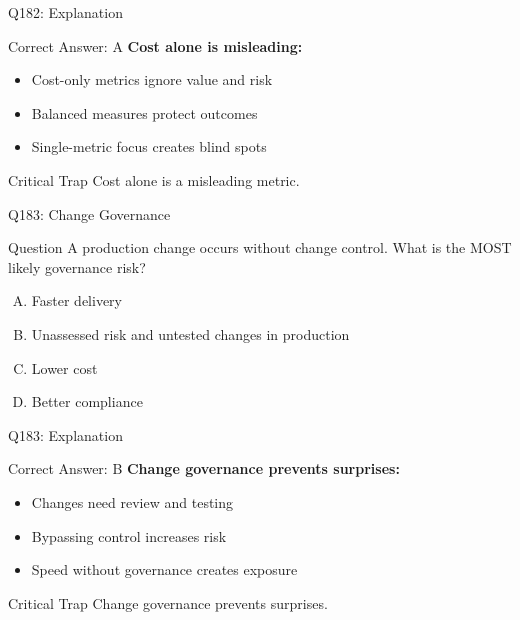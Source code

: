 \documentclass{beamer}
\begin{document}
	\begin{frame}{Q182: Explanation}
		\begin{block}{Correct Answer: A}
			\textbf{Cost alone is misleading:}
			\begin{itemize}
				\item Cost-only metrics ignore value and risk
				\item Balanced measures protect outcomes
				\item Single-metric focus creates blind spots
			\end{itemize}
		\end{block}
		\begin{alertblock}{Critical Trap}
			Cost alone is a misleading metric.
		\end{alertblock}
	\end{frame}
	
	\begin{frame}{Q183: Change Governance}
		\begin{block}{Question}
			A production change occurs without change control. What is the MOST likely governance risk?
		\end{block}
		\begin{enumerate}[(A)]
			\item Faster delivery
			\item Unassessed risk and untested changes in production
			\item Lower cost
			\item Better compliance
		\end{enumerate}
	\end{frame}
	
	\begin{frame}{Q183: Explanation}
		\begin{block}{Correct Answer: B}
			\textbf{Change governance prevents surprises:}
			\begin{itemize}
				\item Changes need review and testing
				\item Bypassing control increases risk
				\item Speed without governance creates exposure
			\end{itemize}
		\end{block}
		\begin{alertblock}{Critical Trap}
			Change governance prevents surprises.
		\end{alertblock}
	\end{frame}
	
\end{document}
